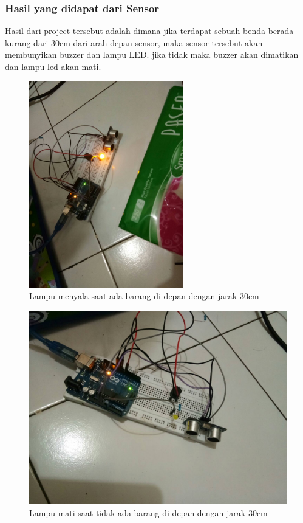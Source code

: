 \documentclass{article}
\begin{document}
\subsubsection{Hasil yang didapat dari Sensor}
Hasil dari project tersebut adalah dimana jika terdapat sebuah benda berada kurang dari 30cm dari arah depan sensor, maka sensor tersebut akan membunyikan buzzer dan lampu LED. jika tidak maka buzzer akan dimatikan dan lampu led akan mati.
\begin{figure}[ht]
\centerline{\includegraphics[width=0.6\textwidth]{figures/adabarang.jpg}}
\caption{Lampu menyala saat ada barang di depan dengan jarak 30cm}
\label{lampunyala}
\end{figure}
\begin{figure}[ht]
\centerline{\includegraphics[width=1\textwidth]{figures/tidakada.jpg}}
\caption{Lampu mati saat tidak ada barang di depan dengan jarak 30cm}
\label{lampumati}
\end{figure}
\end{document}
